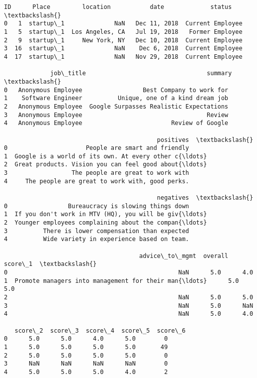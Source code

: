 \documentclass[11pt]{article}
\newcommand{\prompt}[4]{
        \llap{{\color{#2}[#3]: #4}}\vspace{-1.25em}
    }
\begin{document}
            \begin{tcolorbox}[breakable, boxrule=.5pt, size=fbox, pad at break*=1mm, opacityfill=0]
\prompt{Out}{outcolor}{46}{\hspace{3.5pt}}
\begin{Verbatim}[commandchars=\\\{\}]
   ID      Place         location           date             status  \textbackslash{}
0   1  startup\_1              NaN   Dec 11, 2018  Current Employee
1   5  startup\_1  Los Angeles, CA   Jul 19, 2018   Former Employee
2   9  startup\_1     New York, NY   Dec 10, 2018  Current Employee
3  16  startup\_1              NaN    Dec 6, 2018  Current Employee
4  17  startup\_1              NaN   Nov 29, 2018  Current Employee

             job\_title                                  summary  \textbackslash{}
0   Anonymous Employee                 Best Company to work for
1    Software Engineer          Unique, one of a kind dream job
2   Anonymous Employee  Google Surpasses Realistic Expectations
3   Anonymous Employee                                   Review
4   Anonymous Employee                         Review of Google

                                           positives  \textbackslash{}
0                      People are smart and friendly
1  Google is a world of its own. At every other c{\ldots}
2  Great products. Vision you can feel good about{\ldots}
3                  The people are great to work with
4     The people are great to work with, good perks.

                                           negatives  \textbackslash{}
0                 Bureaucracy is slowing things down
1  If you don't work in MTV (HQ), you will be giv{\ldots}
2  Younger employees complaining about the compan{\ldots}
3          There is lower compensation than expected
4          Wide variety in experience based on team.

                                      advice\_to\_mgmt  overall  score\_1  \textbackslash{}
0                                                NaN      5.0      4.0
1  Promote managers into management for their man{\ldots}      5.0      5.0
2                                                NaN      5.0      5.0
3                                                NaN      5.0      NaN
4                                                NaN      5.0      4.0

   score\_2  score\_3  score\_4  score\_5  score\_6
0      5.0      5.0      4.0      5.0        0
1      5.0      5.0      5.0      5.0       49
2      5.0      5.0      5.0      5.0        0
3      NaN      NaN      NaN      NaN        0
4      5.0      5.0      5.0      4.0        2
\end{Verbatim}
\end{tcolorbox}
        
\end{document}
